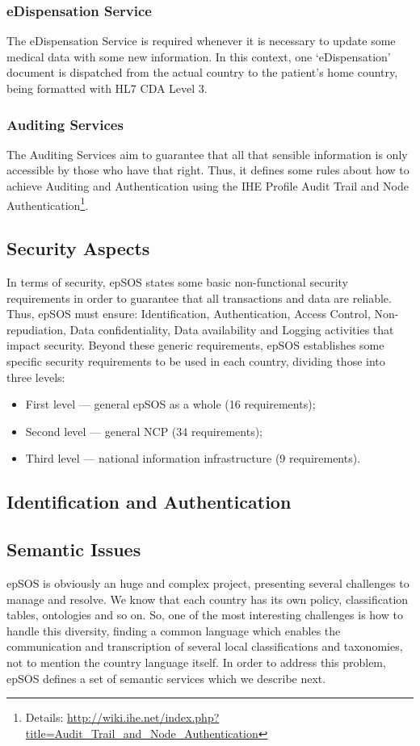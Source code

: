 \subsubsection{eDispensation Service}

The eDispensation Service is required whenever it is necessary to update some medical data with some new information. In this context, one `eDispensation' document is dispatched from the actual country to the patient's home country, being formatted with HL7 CDA Level 3.

\subsubsection{Auditing Services}

The Auditing Services aim to guarantee that all that sensible information is only accessible by those who have that right. Thus, it defines some rules about how to achieve Auditing and Authentication using the IHE Profile Audit Trail and Node Authentication\footnote{Details: \url{http://wiki.ihe.net/index.php?title=Audit_Trail_and_Node_Authentication}}. 

\subsection{Security Aspects}
In terms of security, epSOS states some basic non-functional security requirements in order to guarantee that all transactions and data are reliable. Thus, epSOS must ensure: Identification, Authentication, Access Control, Non-repudiation, Data confidentiality, Data availability and Logging activities that impact security. Beyond these generic requirements, epSOS establishes some specific security requirements to be used in each country, dividing those into three levels:
\begin{itemize}
\item First level --- general epSOS as a whole (16 requirements);
\item Second level --- general NCP (34 requirements);
\item Third level --- national information infrastructure (9 requirements).
\end{itemize}

\subsection{Identification and Authentication}
\subsection{Semantic Issues}
epSOS is obviously an huge and complex project, presenting several challenges to manage and resolve. We know that each country has its own policy, classification tables, ontologies and so on. So, one of the most interesting challenges is how to handle this diversity, finding a common language which enables the communication and transcription of several local classifications and taxonomies, not to mention the country language itself. In order to address this problem, epSOS defines a set of semantic services which we describe next. 

